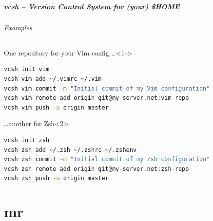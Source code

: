 \documentclass[english,hyperref={pdfpagelabels=false},aspectratio=169]{beamer}
\begin{document}
\begin{frame}[fragile]
  \frametitle{vcsh -- Version Control System for (your) \$HOME}
  \framesubtitle{Examples}
  \begin{block}{One repository for your Vim config \dots}<1->
    \vspace{-0.75em}
    \begin{lstlisting}[language=zsh]
vcsh init vim
vcsh vim add ~/.vimrc ~/.vim
vcsh vim commit -m "Initial commit of my Vim configuration"
vcsh vim remote add origin git@my-server.net:vim-repo
vcsh vim push -u origin master
    \end{lstlisting}
    \vspace{-0.75em}
  \end{block}
  \begin{block}{\dots another for Zsh}<2>
    \vspace{-0.75em}
    \begin{lstlisting}[language=zsh]
vcsh init zsh
vcsh zsh add ~/.zsh ~/.zshrc ~/.zshenv
vcsh zsh commit -m "Initial commit of my Zsh configuration"
vcsh zsh remote add origin git@my-server.net:zsh-repo
vcsh zsh push -u origin master
    \end{lstlisting}
    \vspace{-0.75em}
  \end{block}
\end{frame}


\part{mr}
\makepart
\end{document}

